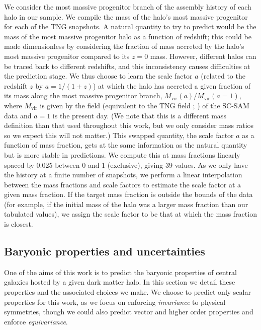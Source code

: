 We consider the most massive progenitor branch of the assembly history of each \dark halo in our sample.
We compile the mass of the halo's most massive progenitor for each of the TNG snapshots. 
A natural quantity to try to predict would be the mass of the most massive progenitor halo as a function of redshift; this could be made dimensionless  by considering the fraction of mass accreted by the halo's most massive progenitor compared to its $z=0$ mass.
However, different halos can be traced back to different redshifts, and this inconsistency causes difficulties at the prediction stage.
We thus choose to learn the scale factor $a$ (related to the redshift $z$ by $a=1/(1+z)$) at which the halo has accreted a given fraction of its mass along the most massive progenitor branch, $M_\mathrm{vir}(a)$/$M_\mathrm{vir}(a=1)$, where $M_\mathrm{vir}$ is given by the  field (equivalent to the TNG field ; \citealt{bryan_statistical_1998}) of the SC-SAM data and $a=1$ is the present day.
(We note that this is a different mass definition than that used throughout this work, but we only consider mass ratios so we expect this will not matter.)
This swapped quantity, the scale factor $a$ as a function of mass fraction, gets at the same information as the natural quantity but is more stable in predictions.
We compute this at mass fractions linearly spaced by 0.025 between 0 and 1 (exclusive), giving 39 values. 
As we only have the history at a finite number of snapshots, we perform a linear interpolation between the mass fractions and scale factors to estimate the scale factor at a given mass fraction.
If the target mass fraction is outside the bounds of the data (for example, if the initial mass of the halo was a larger mass fraction than our tabulated values), we assign the scale factor to be that at which the mass fraction is closest.



\subsection{Baryonic properties and uncertainties}
\label{sec:galprops}

One of the aims of this work is to predict the baryonic properties of central galaxies hosted by a given dark matter halo.
In this section we detail these properties and the associated choices we make. 
We choose to predict only scalar properties for this work, as we focus on enforcing \emph{invariance} to physical symmetries, though we could also predict vector and higher order properties and enforce \emph{equivariance}.

